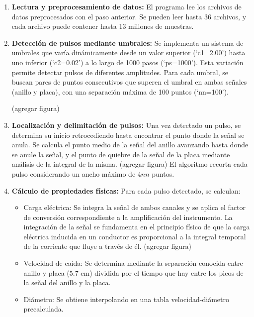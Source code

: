 \documentclass[12pt,a4paper]{article}
\begin{document}
\begin{enumerate}

\item \textbf{Lectura y preprocesamiento de datos:} El programa lee los archivos de datos
preprocesados con el paso anterior. Se pueden leer hasta 36 archivos, y cada archivo puede contener hasta 13 millones de muestras.

\item \textbf{Detección de pulsos mediante umbrales:} Se implementa un sistema de umbrales que varía dinámicamente desde un valor superior (`c1=2.00') hasta
uno inferior (`c2=0.02') a lo largo de 1000 pasos (`ps=1000'). Esta variación permite
detectar pulsos de diferentes amplitudes.
Para cada umbral, se buscan pares de puntos consecutivos que superen el umbral en ambas señales (anillo y placa), con una separación máxima de 100 puntos
(`nn=100').

(agregar figura)

\item \textbf{Localización y delimitación de pulsos:} Una vez detectado un pulso, se determina su inicio retrocediendo hasta encontrar el punto donde la señal se anula. Se
calcula el punto medio de la señal del anillo avanzando hasta donde se anule la señal, y el punto de quiebre de la señal de la placa mediante análisis de la integral de la misma. (agregar figura)
El algoritmo recorta cada pulso considerando un ancho máximo de $4nn$ puntos.

\item \textbf{Cálculo de propiedades físicas:} Para cada pulso detectado, se calculan:

\begin{itemize}
    \item Carga eléctrica: Se integra la señal de ambos canales y se aplica el factor de
    conversión correspondiente a la amplificación del instrumento. La integración de la señal se fundamenta en el principio físico de que la carga eléctrica inducida en un conductor es proporcional a la integral temporal de la corriente que fluye a través de él. (agregar figura)
    \item Velocidad de caída: Se determina mediante la separación conocida entre
    anillo y placa (5.7 cm) dividida por el tiempo que hay entre los picos de la señal del anillo y la placa.
    \item Diámetro: Se obtiene interpolando en una tabla velocidad-diámetro precalculada.
\end{itemize}


\end{enumerate}
\end{document}
